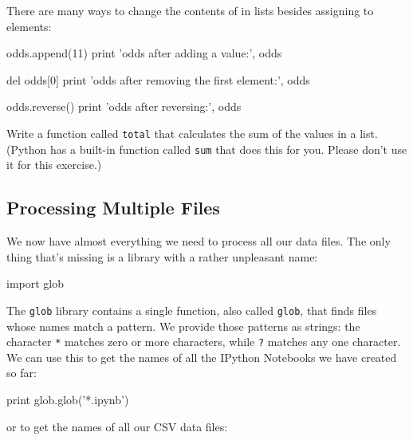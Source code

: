 \documentclass{book}
\begin{document}
There are many ways to change the contents of in lists besides assigning
to elements:

\begin{VerbIn}
odds.append(11)
print 'odds after adding a value:', odds
\end{VerbIn}

\begin{VerbIn}
del odds[0]
print 'odds after removing the first element:', odds
\end{VerbIn}

\begin{VerbIn}
odds.reverse()
print 'odds after reversing:', odds
\end{VerbIn}

\begin{challenge}
  Write a function called \texttt{total} that calculates the sum of the
  values in a list. (Python has a built-in function called \texttt{sum}
  that does this for you. Please don't use it for this exercise.)
\end{challenge}

\subsection{Processing Multiple Files}

We now have almost everything we need to process all our data files. The
only thing that's missing is a library with a rather unpleasant name:

\begin{VerbIn}
import glob
\end{VerbIn}

The \texttt{glob} library contains a single function, also called
\texttt{glob}, that finds files whose names match a pattern. We provide
those patterns as strings: the character \texttt{*} matches zero or more
characters, while \texttt{?} matches any one character. We can use this
to get the names of all the IPython Notebooks we have created so far:

\begin{VerbIn}
print glob.glob('*.ipynb')
\end{VerbIn}

\begin{VerbOut}
\end{VerbOut}

or to get the names of all our CSV data files:
\end{document}
